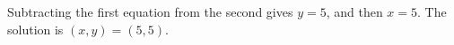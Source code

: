Subtracting the first equation from the second gives $y=5$, and then $x=5$. The solution is $\boxed{(x,y)=(5,5)}$.
